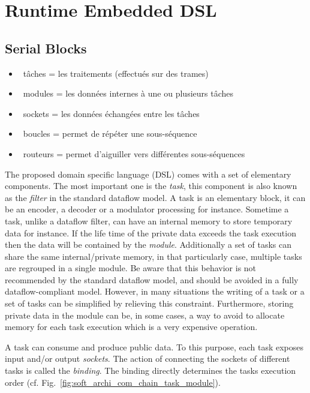\section{Runtime Embedded DSL}

\subsection{Serial Blocks}

\begin{itemize}
  \item \cmark~tâches = les traitements (effectués sur des trames)
  \item \cmark~modules = les données internes à une ou plusieurs tâches
  \item \cmark~sockets = les données échangées entre les tâches
  \item \cmark~boucles = permet de répéter une sous-séquence
  \item \xmark~routeurs = permet d'aiguiller vers différentes sous-séquences
\end{itemize}

The proposed domain specific language (DSL) comes with a set of elementary
components. The most important one is the \emph{task}, this component is also
known as the \emph{filter} in the standard dataflow model. A task is an
elementary block, it can be an encoder, a decoder or a modulator processing for
instance. Sometime a task, unlike a dataflow filter, can have an internal memory
to store temporary data for instance. If the life time of the private data
exceeds the task execution then the data will be contained by the \emph{module}.
Additionally a set of tasks can share the same internal/private memory, in that
particularly case, multiple tasks are regrouped in a single module. Be aware
that this behavior is not recommended by the standard dataflow model, and should
be avoided in a fully dataflow-compliant model. However, in many situations the
writing of a task or a set of tasks can be simplified by relieving this
constraint. Furthermore, storing private data in the module can be, in some
cases, a way to avoid to allocate memory for each task execution which is a very
expensive operation.

A task can consume and produce public data. To this purpose, each task exposes
input and/or output \emph{sockets}. The action of connecting the sockets of
different tasks is called the \emph{binding}. The binding directly determines
the tasks execution order (cf. Fig.~\ref{fig:soft_archi_com_chain_task_module}).

